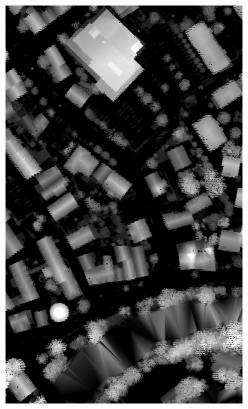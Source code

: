 \begin{figure}[htb]
\begin{subfigure}{0.19\textwidth}
  \includegraphics[width=1\linewidth]{fig/vai/26_hm.jpg}
\end{subfigure}
\begin{subfigure}{0.19\textwidth}
  \centering

\end{subfigure}
\end{figure}
